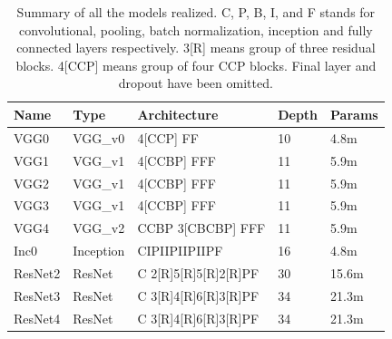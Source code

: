\documentclass[10pt,twocolumn,letterpaper]{article}
\begin{document}
\begin{table}[]

   \scriptsize
   \begin{tabular}{L{0.8cm}C{0.6cm}C{3.4cm}C{0.6cm}C{0.8cm}}
      \hline
      Name    & Type      & Architecture         & Depth & Params \\
      \hline\hline
      VGG0    & VGG\_v0   & 4[CCP] FF            & 10    & 4.8m   \\
      VGG1    & VGG\_v1   & 4[CCBP] FFF          & 11    & 5.9m   \\
      VGG2    & VGG\_v1   & 4[CCBP] FFF          & 11    & 5.9m   \\
      VGG3    & VGG\_v1   & 4[CCBP] FFF          & 11    & 5.9m   \\
      VGG4    & VGG\_v2   & CCBP 3[CBCBP] FFF    & 11    & 5.9m   \\
      Inc0    & Inception & CIPIIPIIPIIPF        & 16    & 4.8m   \\
      ResNet2 & ResNet    & C 2[R]5[R]5[R]2[R]PF & 30    & 15.6m  \\
      ResNet3 & ResNet    & C 3[R]4[R]6[R]3[R]PF & 34    & 21.3m  \\
      ResNet4 & ResNet    & C 3[R]4[R]6[R]3[R]PF & 34    & 21.3m  \\
      \hline
   \end{tabular}
   \label{model:stable}
   \caption{Summary of all the models realized. C, P, B, I, and F stands for convolutional, pooling, batch normalization, inception and fully connected layers respectively. 3[R] means group of three residual blocks. 4[CCP] means group of four CCP blocks. Final layer and dropout have been omitted.}

\end{table}
\end{document}
